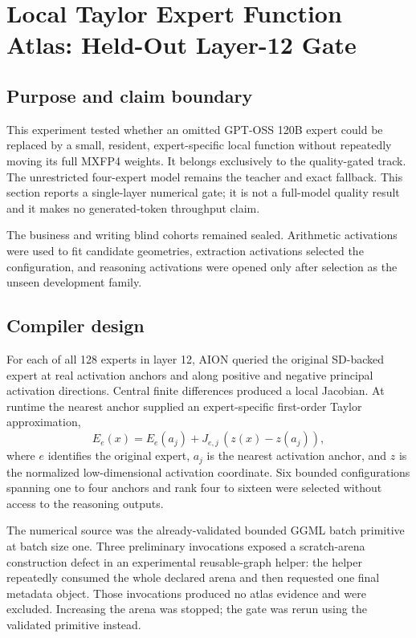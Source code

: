 \section{Local Taylor Expert Function Atlas: Held-Out Layer-12 Gate}
\label{sec:gptoss120b-taylor-atlas-gate}

\subsection{Purpose and claim boundary}

This experiment tested whether an omitted GPT-OSS 120B expert could be replaced by a
small, resident, expert-specific local function without repeatedly moving its full
MXFP4 weights.  It belongs exclusively to the quality-gated track.  The unrestricted
four-expert model remains the teacher and exact fallback.  This section reports a
single-layer numerical gate; it is not a full-model quality result and it makes no
generated-token throughput claim.

The business and writing blind cohorts remained sealed.  Arithmetic activations were
used to fit candidate geometries, extraction activations selected the configuration,
and reasoning activations were opened only after selection as the unseen development
family.

\subsection{Compiler design}

For each of all 128 experts in layer 12, AION queried the original SD-backed expert at
real activation anchors and along positive and negative principal activation
directions.  Central finite differences produced a local Jacobian.  At runtime the
nearest anchor supplied an expert-specific first-order Taylor approximation,
\begin{equation}
 \widehat{E}_e(x) = E_e(a_j) + J_{e,j}\,(z(x)-z(a_j)),
\end{equation}
where $e$ identifies the original expert, $a_j$ is the nearest activation anchor,
and $z$ is the normalized low-dimensional activation coordinate.  Six bounded
configurations spanning one to four anchors and rank four to sixteen were selected
without access to the reasoning outputs.

The numerical source was the already-validated bounded GGML batch primitive at batch
size one.  Three preliminary invocations exposed a scratch-arena construction defect
in an experimental reusable-graph helper: the helper repeatedly consumed the whole
declared arena and then requested one final metadata object.  Those invocations
produced no atlas evidence and were excluded.  Increasing the arena was stopped; the
gate was rerun using the validated primitive instead.

